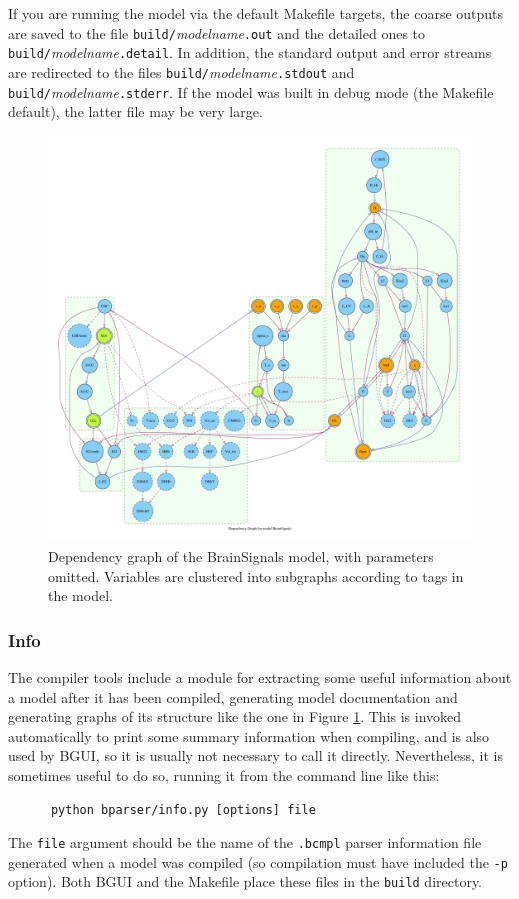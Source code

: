 \documentclass[a4paper,11pt]{article}
\begin{document}
If you are running the model via the default Makefile targets, the coarse outputs are saved to the file \texttt{build/}\textit{modelname}\texttt{.out} and the detailed ones to \texttt{build/}\textit{modelname}\texttt{.detail}. In addition, the standard output and error streams are redirected to the files \texttt{build/}\textit{modelname}\texttt{.stdout} and \texttt{build/}\textit{model\-name}\texttt{.stderr}. If the model was built in debug mode (the Makefile default), the latter file may be very large.

\begin{figure}[tbph]
\begin{center}
\includegraphics[scale=0.25]{figures/graph.pdf}
\caption{Dependency graph of the BrainSignals model, with parameters omitted. Variables are clustered into subgraphs according to tags in the model.}
\label{fig:graph}
\end{center}
\end{figure}

\subsubsection{Info}\label{info}

The compiler tools include a module for extracting some useful information about a model after it has been compiled, generating model documentation and generating graphs of its structure like the one in Figure \ref{fig:graph}. This is invoked automatically to print some summary information when compiling, and is also used by BGUI, so it is usually not necessary to call it directly. Nevertheless, it is sometimes useful to do so, running it from the command line like this:
\begin{verbatim}
      python bparser/info.py [options] file
\end{verbatim}
The \texttt{file} argument should be the name of the \texttt{.bcmpl} parser information file generated when a model was compiled (so compilation must have included the \texttt{-p} option). Both BGUI and the Makefile place these files in the \texttt{build} directory.
\end{document}
